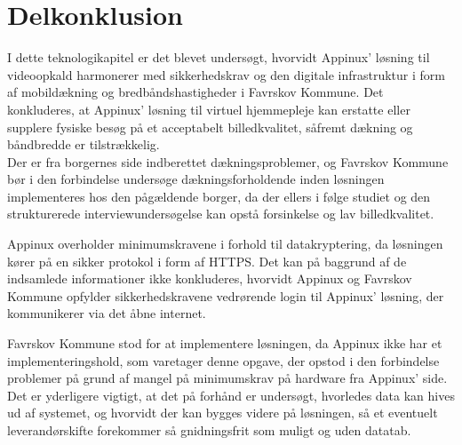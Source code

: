 \section{Delkonklusion}
I dette teknologikapitel er det blevet undersøgt, hvorvidt Appinux’ løsning til videoopkald harmonerer med sikkerhedskrav og den digitale infrastruktur i form af mobildækning og bredbåndshastigheder i Favrskov Kommune.
Det konkluderes, at Appinux’ løsning til virtuel hjemmepleje kan erstatte eller supplere fysiske besøg på et acceptabelt billedkvalitet, såfremt dækning og båndbredde er tilstrækkelig.
\\Der er fra borgernes side indberettet dækningsproblemer, og Favrskov Kommune bør i den forbindelse undersøge dækningsforholdende inden løsningen implementeres hos den pågældende borger, da der ellers i følge studiet  og den strukturerede interviewundersøgelse kan opstå forsinkelse og lav billedkvalitet.

Appinux overholder minimumskravene i forhold til datakryptering, da løsningen kører på en sikker protokol i form af HTTPS. Det kan på baggrund af de indsamlede informationer ikke konkluderes, hvorvidt Appinux og Favrskov Kommune opfylder sikkerhedskravene vedrørende login til Appinux' løsning, der kommunikerer via det åbne internet. 

Favrskov Kommune stod for at implementere løsningen, da Appinux ikke har et implementeringshold, som varetager denne opgave, der opstod i den forbindelse problemer på grund af mangel på minimumskrav på hardware fra Appinux' side. Det er yderligere vigtigt, at det på forhånd er undersøgt, hvorledes data kan hives ud af systemet, og hvorvidt der kan bygges videre på løsningen, så et eventuelt leverandørskifte forekommer så gnidningsfrit som muligt og uden datatab.
